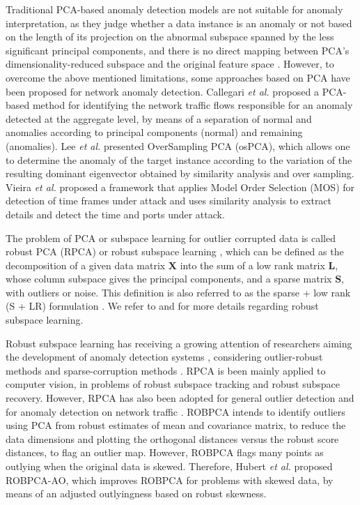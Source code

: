 \documentclass[review]{elsarticle}
\begin{document}
Traditional PCA-based anomaly detection models are not suitable for anomaly interpretation, as they judge whether a data instance is an anomaly or not based on the length of its projection on the abnormal subspace spanned by the less significant principal components, and there is no direct mapping between PCA’s dimensionality-reduced subspace and the original feature space \cite{ringberg2007sensitivity}. However, to overcome the above mentioned limitations, some approaches based on PCA have been proposed for network anomaly detection. Callegari \emph{et al.} \cite{callegari2011novel} proposed a PCA-based method for identifying the network traffic flows responsible for an anomaly detected at the aggregate level, by means of a separation of normal and anomalies according to principal components (normal) and remaining (anomalies). Lee \emph{et al.} \cite{Lee2013} presented OverSampling PCA (osPCA), which allows one to determine the anomaly of the target instance according to the variation of the resulting dominant eigenvector obtained by similarity analysis and over sampling. Vieira \emph{et al.} \cite{vieira2017model} proposed a framework that applies Model Order Selection (MOS) for detection of time frames under attack and uses similarity analysis to extract details and detect the time and ports under attack.

The problem of PCA or subspace learning for outlier corrupted data is called robust PCA (RPCA) or robust subspace learning \cite{vaswani2018robust}, which can be defined as the decomposition of a given data matrix $\textbf{X}$ into the sum of a low rank matrix $\textbf{L}$, whose column subspace gives the principal components, and a sparse matrix $\textbf{S}$, with outliers or noise. This definition is also referred to as the sparse + low rank (S + LR) formulation \cite{vaswani2018robust}. We refer to \cite{lerman2018overview} and \cite{vaswani2018robust} for more details regarding robust subspace learning. 

Robust subspace learning has receiving a growing attention of researchers aiming the development of anomaly detection systems \cite{rousseeuw1984mcd, rousseeuw1999fastmcd}, considering outlier-robust methods and sparse-corruption methods \cite{lerman2018overview}. RPCA is been mainly applied to computer vision, in problems of robust subspace tracking and robust subspace recovery. However, RPCA has also been adopted for general outlier detection \cite{hubert2005robpca,hubert2009robustskewed,cherapanamjeri2017thresholding,zhou2017anomaly,NetflixSurus} and for anomaly detection on network traffic \cite{pascoal2012robust}. ROBPCA \cite{hubert2005robpca} intends to identify outliers using PCA from robust estimates of mean and covariance matrix, to reduce the data dimensions and plotting the orthogonal distances versus the robust score distances, to flag an outlier map. However, ROBPCA flags many points as outlying when the original data is skewed. Therefore, Hubert \emph{et al.} \cite{hubert2009robustskewed} proposed ROBPCA-AO, which improves ROBPCA for problems with skewed data, by means of an adjusted outlyingness based on robust skewness. 
\end{document}
